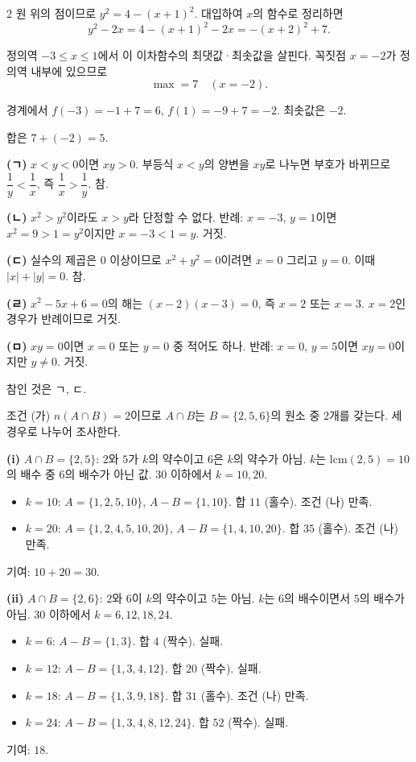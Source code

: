 \documentclass[10pt,fleqn]{article}
\renewcommand{\solpart}[1]{%
  \par\addvspace{10pt}\noindent
  {\sffamily\bfseries\color{black}(#1)}\hspace{3mm}\ignorespaces%
}
\begin{document}
\begin{multicols}{2}
원 위의 점이므로 $y^{2} = 4 - (x+1)^{2}$. 대입하여 $x$의 함수로 정리하면
\[ y^{2} - 2x = 4 - (x+1)^{2} - 2x = -(x+2)^{2} + 7. \]

정의역 $-3 \le x \le 1$에서 이 이차함수의 최댓값·최솟값을 살핀다. 꼭짓점 $x = -2$가 정의역 내부에 있으므로
\[ \max = 7\quad(x=-2). \]

경계에서 $f(-3) = -1 + 7 = 6$, $f(1) = -9 + 7 = -2$. 최솟값은 $-2$.

합은 $7 + (-2) = 5$.


\solpart{ㄱ} $x < y < 0$이면 $xy > 0$. 부등식 $x < y$의 양변을 $xy$로 나누면 부호가 바뀌므로 $\dfrac{1}{y} < \dfrac{1}{x}$, 즉 $\dfrac{1}{x} > \dfrac{1}{y}$. 참.

\solpart{ㄴ} $x^{2} > y^{2}$이라도 $x > y$라 단정할 수 없다. 반례: $x = -3$, $y = 1$이면 $x^{2} = 9 > 1 = y^{2}$이지만 $x = -3 < 1 = y$. 거짓.

\solpart{ㄷ} 실수의 제곱은 $0$ 이상이므로 $x^{2} + y^{2} = 0$이려면 $x = 0$ 그리고 $y = 0$. 이때 $|x| + |y| = 0$. 참.

\solpart{ㄹ} $x^{2} - 5x + 6 = 0$의 해는 $(x-2)(x-3) = 0$, 즉 $x = 2$ 또는 $x = 3$. $x = 2$인 경우가 반례이므로 거짓.

\solpart{ㅁ} $xy = 0$이면 $x = 0$ 또는 $y = 0$ 중 적어도 하나. 반례: $x = 0$, $y = 5$이면 $xy = 0$이지만 $y \ne 0$. 거짓.

참인 것은 ㄱ, ㄷ.


조건 (가) $n(A \cap B) = 2$이므로 $A \cap B$는 $B = \{2, 5, 6\}$의 원소 중 $2$개를 갖는다. 세 경우로 나누어 조사한다.

\solpart{i} $A \cap B = \{2, 5\}$: $2$와 $5$가 $k$의 약수이고 $6$은 $k$의 약수가 아님. $k$는 $\mathrm{lcm}(2, 5) = 10$의 배수 중 $6$의 배수가 아닌 값. $30$ 이하에서 $k = 10, 20$.
\begin{itemize}[leftmargin=1.2em, itemsep=1pt]
\item $k = 10$: $A = \{1, 2, 5, 10\}$, $A - B = \{1, 10\}$. 합 $11$ (홀수). 조건 (나) 만족.
\item $k = 20$: $A = \{1, 2, 4, 5, 10, 20\}$, $A - B = \{1, 4, 10, 20\}$. 합 $35$ (홀수). 조건 (나) 만족.
\end{itemize}
기여: $10 + 20 = 30$.

\solpart{ii} $A \cap B = \{2, 6\}$: $2$와 $6$이 $k$의 약수이고 $5$는 아님. $k$는 $6$의 배수이면서 $5$의 배수가 아님. $30$ 이하에서 $k = 6, 12, 18, 24$.
\begin{itemize}[leftmargin=1.2em, itemsep=1pt]
\item $k = 6$: $A - B = \{1, 3\}$. 합 $4$ (짝수). 실패.
\item $k = 12$: $A - B = \{1, 3, 4, 12\}$. 합 $20$ (짝수). 실패.
\item $k = 18$: $A - B = \{1, 3, 9, 18\}$. 합 $31$ (홀수). 조건 (나) 만족.
\item $k = 24$: $A - B = \{1, 3, 4, 8, 12, 24\}$. 합 $52$ (짝수). 실패.
\end{itemize}
기여: $18$.


\end{multicols}
\end{document}
